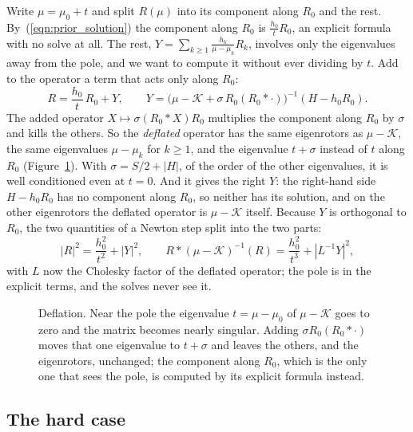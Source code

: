 \documentclass{birkjour}
\theoremstyle{definition}
\theoremstyle{remark}
\numberwithin{equation}{section}
\newcommand{\K}{\mathcal{K}}
\begin{document}
Write $\mu = \mu_0 + t$ and split $R(\mu)$ into its component along $R_0$ and the rest. By~(\ref{eqn:prior_solution}) the component along $R_0$ is $\frac{h_0}{t} R_0$, an explicit formula with no solve at all. The rest, $Y = \sum_{k \geq 1} \frac{h_k}{\mu - \mu_k} R_k$, involves only the eigenvalues away from the pole, and we want to compute it without ever dividing by $t$. Add to the operator a term that acts only along $R_0$:
\begin{equation}
\label{eqn:prior_deflated}
R = \frac{h_0}{t}\, R_0 + Y, \qquad Y = \big( \mu - \K + \sigma\, R_0 (R_0 * \cdot) \big)^{-1} (H - h_0 R_0).
\end{equation}
The added operator $X \mapsto \sigma (R_0 * X) R_0$ multiplies the component along $R_0$ by $\sigma$ and kills the others. So the \emph{deflated} operator has the same eigenrotors as $\mu - \K$, the same eigenvalues $\mu - \mu_k$ for $k \geq 1$, and the eigenvalue $t + \sigma$ instead of $t$ along $R_0$ (Figure~\ref{fig:prior_deflation}). With $\sigma = S/2 + |H|$, of the order of the other eigenvalues, it is well conditioned even at $t = 0$. And it gives the right $Y$: the right-hand side $H - h_0 R_0$ has no component along $R_0$, so neither has its solution, and on the other eigenrotors the deflated operator is $\mu - \K$ itself. Because $Y$ is orthogonal to $R_0$, the two quantities of a Newton step split into the two parts:
\begin{equation*}
|R|^2 = \frac{h_0^2}{t^2} + |Y|^2, \qquad R * (\mu - \K)^{-1}(R) = \frac{h_0^2}{t^3} + |L^{-1} Y|^2,
\end{equation*}
with $L$ now the Cholesky factor of the deflated operator; the pole is in the explicit terms, and the solves never see it.

\begin{figure}[t]
\centering
{}
\caption{Deflation. Near the pole the eigenvalue $t = \mu - \mu_0$ of $\mu - \K$ goes to zero and the matrix becomes nearly singular. Adding $\sigma R_0 (R_0 * \cdot)$ moves that one eigenvalue to $t + \sigma$ and leaves the others, and the eigenrotors, unchanged; the component along $R_0$, which is the only one that sees the pole, is computed by its explicit formula instead.}
\label{fig:prior_deflation}
\end{figure}

\subsection{The hard case}
\end{document}
